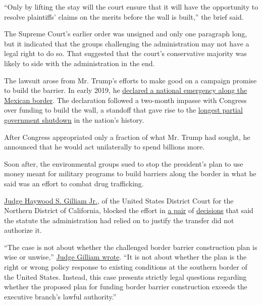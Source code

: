 ``Only by lifting the stay will the court ensure that it will have the
opportunity to resolve plaintiffs' claims on the merits before the wall
is built,'' the brief said.

The Supreme Court's earlier order was unsigned and only one paragraph
long, but it indicated that the groups challenging the administration
may not have a legal right to do so. That suggested that the court's
conservative majority was likely to side with the administration in the
end.

The lawsuit arose from Mr. Trump's efforts to make good on a campaign
promise to build the barrier. In early 2019, he
\href{https://www.nytimes.com/2019/02/15/us/politics/national-emergency-trump.html?module=inline}{declared
a national emergency along the Mexican border}. The declaration followed
a two-month impasse with Congress over funding to build the wall, a
standoff that gave rise to the
\href{https://www.nytimes.com/interactive/2019/01/09/us/politics/longest-government-shutdown.html}{longest
partial government shutdown} in the nation's history.

After Congress appropriated only a fraction of what Mr. Trump had
sought, he announced that he would act unilaterally to spend billions
more.

Soon after, the environmental groups sued to stop the president's plan
to use money meant for military programs to build barriers along the
border in what he said was an effort to combat drug trafficking.

\href{https://www.fjc.gov/history/judges/gilliam-haywood-stirling-jr}{Judge
Haywood S. Gilliam Jr.}, of the United States District Court for the
Northern District of California, blocked the effort in
\href{https://assets.documentcloud.org/documents/6026005/California-Border-Wall-20190524.pdf}{a
pair} of
\href{https://assets.documentcloud.org/documents/6177180/Sierra-Club-Ruling.pdf}{decisions}
that said the statute the administration had relied on to justify the
transfer did not authorize it.

``The case is not about whether the challenged border barrier
construction plan is wise or unwise,''
\href{https://assets.documentcloud.org/documents/6026005/California-Border-Wall-20190524.pdf}{Judge
Gilliam wrote}. ``It is not about whether the plan is the right or wrong
policy response to existing conditions at the southern border of the
United States. Instead, this case presents strictly legal questions
regarding whether the proposed plan for funding border barrier
construction exceeds the executive branch's lawful authority.''

